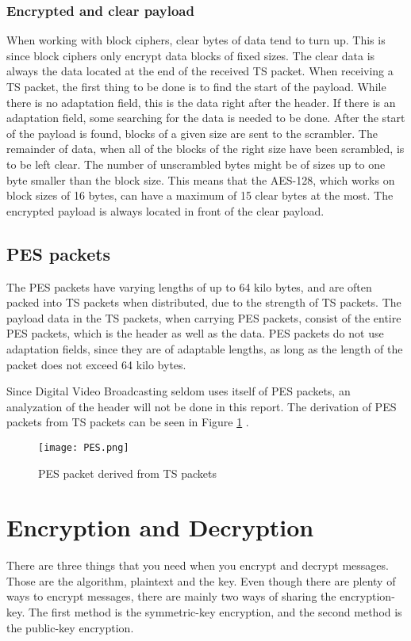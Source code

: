 \subsubsection{Encrypted and clear payload}
When working with block ciphers, clear bytes of data tend to turn up. 
This is since block ciphers only encrypt data blocks of fixed sizes. 
The clear data is always the data located at the end of the received TS 
packet. When receiving a TS packet, the first thing to be done is to 
find the start of the payload. While there is no adaptation field, this 
is the data right after the header. If there is an adaptation field, 
some searching for the data is needed to be done. After the start of 
the payload is found, blocks of a given size are sent to the scrambler.
The remainder of data, when all of the blocks of the right size have 
been scrambled, is to be left clear. The number of unscrambled bytes 
might be of sizes up to one byte smaller than the block size. This 
means that the AES-128, which works on block sizes of 16 bytes, can 
have a maximum of 15 clear bytes at the most. The encrypted payload is 
always located in front of the clear payload. 
\cite[pp. 10--11]{DVB:2013}

\subsection{PES packets}
The PES packets have varying lengths of up to 64 kilo bytes, and are 
often packed into TS packets when distributed, due to the strength of 
TS packets. The payload data in the TS packets, when carrying PES 
packets, consist of the entire PES packets, which is the header as well 
as the data. PES packets do not use adaptation fields, since they are 
of adaptable lengths, as long as the length of the packet does not 
exceed 64 kilo bytes.

Since Digital Video Broadcasting seldom uses itself of PES packets, an 
analyzation of the header will not be done in this report. The 
derivation of PES packets from TS packets can be seen in Figure 
\ref{img:PES} \citep[p. 9]{ETR:289}.

\begin{figure}[h!]
  \texttt{[image: PES.png]}
  \caption{PES packet derived from TS packets}
  \label{img:PES}
\end{figure}

\section{Encryption and Decryption}
There are three things that you need when you encrypt and decrypt 
messages. Those are the algorithm, plaintext and the key. Even though 
there are plenty of ways to encrypt messages, there are mainly two ways 
of sharing the encryption-key. The first method is the symmetric-key 
encryption, and the second method is the public-key encryption. 


